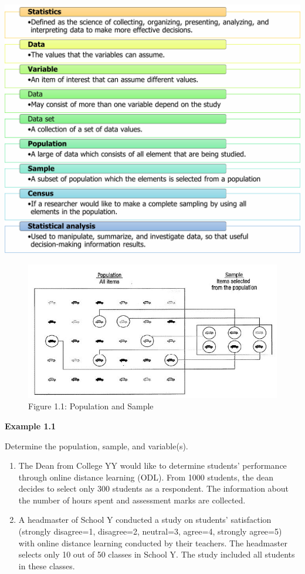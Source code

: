 \documentclass[
  a4paper,
  DIV=11,
  numbers=noendperiod,
  oneside]{scrreprt}
\begin{document}
\includegraphics[width=6.25in,height=\textheight]{images/ch1/Picture3.png}

\begin{figure}

{\centering \includegraphics[width=5.20833in,height=\textheight]{images/ch1/Picture4.jpg}

}

\caption{Figure 1.1: Population and Sample}

\end{figure}

{\textbf{Example 1.1}}

Determine the population, sample, and variable(s).

\begin{enumerate}
\def\labelenumi{\alph{enumi})}
\item
  The Dean from College YY would like to determine students' performance
  through online distance learning (ODL). From 1000 students, the dean
  decides to select only 300 students as a respondent. The information
  about the number of hours spent and assessment marks are collected.
\item
  A headmaster of School Y conducted a study on students' satisfaction
  (strongly disagree=1, disagree=2, neutral=3, agree=4, strongly
  agree=5) with online distance learning conducted by their teachers.
  The headmaster selects only 10 out of 50 classes in School Y. The
  study included all students in these classes.
\end{enumerate}
\end{document}
